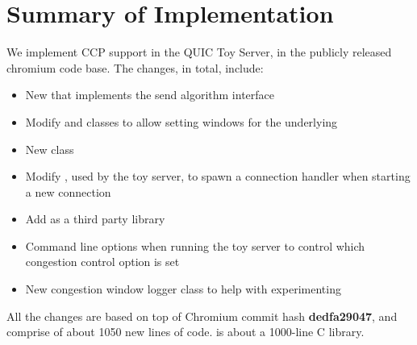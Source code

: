 \section{Summary of Implementation}
We implement CCP support in the QUIC Toy Server, in the publicly released chromium code base.
The changes, in total, include:
\begin{itemize}
    \item New  that implements the send algorithm interface
    \item Modify  and  classes to allow setting windows for the underlying 
    \item New  class
    \item Modify , used by the toy server, to spawn a connection handler when starting a new connection
    \item Add  as a third party library
    \item Command line options when running the toy server to control which congestion control option is set
    \item New congestion window logger class to help with experimenting
\end{itemize}
All the changes are based on top of Chromium commit hash \textbf{dedfa29047}, and comprise of about 1050 new lines of code.
 is about a 1000-line C library.
 
